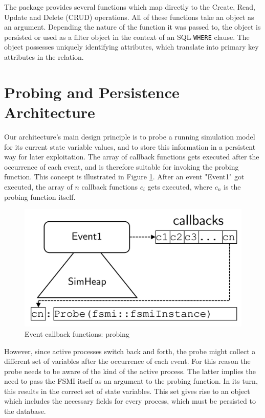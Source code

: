 \documentclass{juliacon}
\begin{document}
The package provides several functions which map directly to the Create, Read, Update and Delete (CRUD) operations. All of these functions take an object as an argument. Depending the nature of the function it was passed to, the object is persisted or used as a filter object in the context of an SQL \texttt{WHERE} clause. The object possesses uniquely identifying attributes, which translate into primary key attributes in the relation. \vskip 6pt

\section{Probing and Persistence Architecture}\label{PArch}

Our architecture's main design principle is to probe a running simulation model for its current state variable values, and to store this information in a persistent way for later exploitation. The array of callback functions gets executed after the occurrence of each event, and is therefore suitable for invoking the probing function.
This concept is illustrated in Figure \ref{fig:cbprobing}. After an event "Event1" got executed, the array of $n$ callback functions $c_i$ gets executed, where $c_n$ is the probing function itself.

\begin{figure}[th]
	\centering
	\includegraphics[width=0.9\linewidth]{images/simHeapCallbacksProbe}
	\caption{Event callback functions: probing}
	\label{fig:cbprobing}
\end{figure}
 However, since active processes switch back and forth, the probe might collect a different set of variables after the occurrence of each event. For this reason the probe needs to be aware of the kind of the active process. The latter implies the need to pass the FSMI itself as an argument to the probing function. In its turn, this results in the correct set of state variables. This set gives rise to an object which includes the necessary fields for every process, which must be persisted to the database. \vskip 6pt
\end{document}
